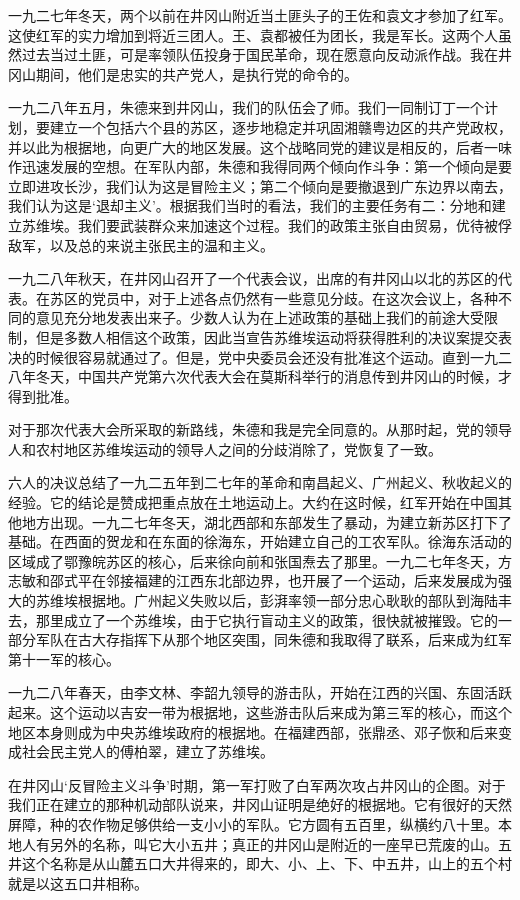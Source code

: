 \documentclass[10pt]{book}
\begin{document}
一九二七年冬天，两个以前在井冈山附近当土匪头子的王佐和袁文才参加了红军。这使红军的实力增加到将近三团人。王、袁都被任为团长，我是军长。这两个人虽然过去当过土匪，可是率领队伍投身于国民革命，现在愿意向反动派作战。我在井冈山期间，他们是忠实的共产党人，是执行党的命令的。

一九二八年五月，朱德来到井冈山，我们的队伍会了师。我们一同制订丁一个计划，要建立一个包括六个县的苏区，逐步地稳定并巩固湘赣粤边区的共产党政权，并以此为根据地，向更广大的地区发展。这个战略同党的建议是相反的，后者一味作迅速发展的空想。在军队内部，朱德和我得同两个倾向作斗争：第一个倾向是要立即进攻长沙，我们认为这是冒险主义；第二个倾向是要撤退到广东边界以南去，我们认为这是‘退却主义’。根据我们当时的看法，我们的主要任务有二：分地和建立苏维埃。我们要武装群众来加速这个过程。我们的政策主张自由贸易，优待被俘敌军，以及总的来说主张民主的温和主义。

一九二八年秋天，在井冈山召开了一个代表会议，出席的有井冈山以北的苏区的代表。在苏区的党员中，对于上述各点仍然有一些意见分歧。在这次会议上，各种不同的意见充分地发表出来子。少数人认为在上述政策的基础上我们的前途大受限制，但是多数人相信这个政策，因此当宣告苏维埃运动将获得胜利的决议案提交表决的时候很容易就通过了。但是，党中央委员会还没有批准这个运动。直到一九二八年冬天，中国共产党第六次代表大会在莫斯科举行的消息传到井冈山的时候，才得到批准。

对于那次代表大会所采取的新路线，朱德和我是完全同意的。从那时起，党的领导人和农村地区苏维埃运动的领导人之间的分歧消除了，党恢复了一致。

六人的决议总结了一九二五年到二七年的革命和南昌起义、广州起义、秋收起义的经验。它的结论是赞成把重点放在土地运动上。大约在这时候，红军开始在中国其他地方出现。一九二七年冬天，湖北西部和东部发生了暴动，为建立新苏区打下了基础。在西面的贺龙和在东面的徐海东，开始建立自己的工农军队。徐海东活动的区域成了鄂豫皖苏区的核心，后来徐向前和张国焘去了那里。一九二七年冬天，方志敏和邵式平在邻接福建的江西东北部边界，也开展了一个运动，后来发展成为强大的苏维埃根据地。广州起义失败以后，彭湃率领一部分忠心耿耿的部队到海陆丰去，那里成立了一个苏维埃，由于它执行盲动主义的政策，很快就被摧毁。它的一部分军队在古大存指挥下从那个地区突围，同朱德和我取得了联系，后来成为红军第十一军的核心。

一九二八年春天，由李文林、李韶九领导的游击队，开始在江西的兴国、东固活跃起来。这个运动以吉安一带为根据地，这些游击队后来成为第三军的核心，而这个地区本身则成为中央苏维埃政府的根据地。在福建西部，张鼎丞、邓子恢和后来变成社会民主党人的傅柏翠，建立了苏维埃。

在井冈山‘反冒险主义斗争’时期，第一军打败了白军两次攻占井冈山的企图。对于我们正在建立的那种机动部队说来，井冈山证明是绝好的根据地。它有很好的天然屏障，种的农作物足够供给一支小小的军队。它方圆有五百里，纵横约八十里。本地人有另外的名称，叫它大小五井；真正的井冈山是附近的一座早已荒废的山。五井这个名称是从山麓五口大井得来的，即大、小、上、下、中五井，山上的五个村就是以这五口井相称。
\end{document}
